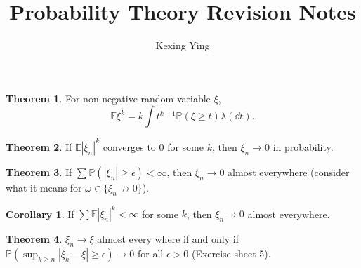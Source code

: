 \documentclass[]{article}
\title{Probability Theory Revision Notes}
\author{Kexing Ying}
\theoremstyle{definition}
\newtheorem*{theorem}{Theorem}
\newtheorem*{corollary}{Corollary}
\begin{document}
\maketitle

\begin{theorem}
  For non-negative random variable \(\xi\), 
  \[\mathbb{E}\xi^k = k \int t^{k - 1} \mathbb{P}(\xi \ge t) \lambda(\dd t).\]
\end{theorem}

\begin{theorem}
  If \(\mathbb{E}|\xi_n|^k\) converges to 0 for some \(k\), then \(\xi_n \to 0\) 
  in probability.
\end{theorem}

\begin{theorem}
  If \(\sum \mathbb{P}(|\xi_n| \ge \epsilon) < \infty\), then \(\xi_n \to 0\) almost everywhere 
  (consider what it means for \(\omega \in \{\xi_n \not \to 0\}\)).  
\end{theorem}

\begin{corollary}
  If \(\sum \mathbb{E}|\xi_n|^k < \infty\) for some \(k\), then \(\xi_n \to 0\) almost everywhere.
\end{corollary}

\begin{theorem}
  \(\xi_n \to \xi\) almost every where if and only if \(\mathbb{P}(\sup_{k \ge n}|\xi_k - \xi| \ge \epsilon) \to 0\) 
  for all \(\epsilon > 0\) (Exercise sheet 5).
\end{theorem}
\end{document}
